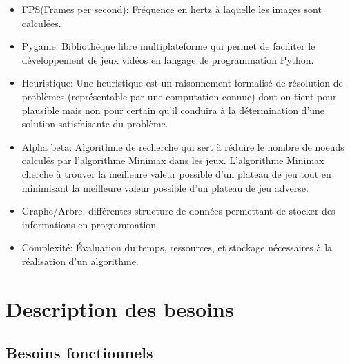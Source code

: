 \documentclass[french]{article}
\begin{document}
\begin{itemize}
    \item FPS(Frames per second): Fréquence en hertz à laquelle les images sont calculées.
    \newline
    \item Pygame: Bibliothèque libre multiplateforme qui permet de faciliter le développement de jeux vidéos en langage de programmation Python.
    \newline
    \item Heuristique: Une heuristique est un raisonnement formalisé de résolution de problèmes (représentable par une computation connue) dont on tient pour plausible mais non pour certain qu’il conduira à la détermination d’une solution satisfaisante du problème.
    \newline
    \item Alpha beta: Algorithme de recherche qui sert à réduire le nombre de noeuds calculés par l'algorithme Minimax dans les jeux. L'algorithme Minimax cherche à trouver la meilleure valeur possible d'un plateau de jeu tout en minimisant la meilleure valeur possible d'un plateau de jeu adverse.
    \newline
    \item Graphe/Arbre: différentes structure de données permettant de stocker des informations en programmation.
    \newline
    \item Complexité: Évaluation du temps, ressources, et stockage nécessaires à la réalisation d'un algorithme.
    

\end{itemize}{}


\section{Description des besoins}

\subsection{Besoins fonctionnels}
\end{document}

